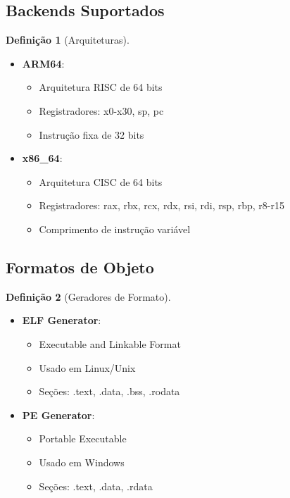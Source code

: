 \documentclass[12pt,a4paper]{article}
\theoremstyle{definition}
\newtheorem{definition}{Definição}[section]
\begin{document}
\subsection{Backends Suportados}

\begin{definition}[Arquiteturas]
\begin{itemize}
    \item \textbf{ARM64}:
    \begin{itemize}
        \item Arquitetura RISC de 64 bits
        \item Registradores: x0-x30, sp, pc
        \item Instrução fixa de 32 bits
    \end{itemize}
    
    \item \textbf{x86\_64}:
    \begin{itemize}
        \item Arquitetura CISC de 64 bits
        \item Registradores: rax, rbx, rcx, rdx, rsi, rdi, rsp, rbp, r8-r15
        \item Comprimento de instrução variável
    \end{itemize}
\end{itemize}
\end{definition}

\subsection{Formatos de Objeto}

\begin{definition}[Geradores de Formato]
\begin{itemize}
    \item \textbf{ELF Generator}:
    \begin{itemize}
        \item Executable and Linkable Format
        \item Usado em Linux/Unix
        \item Seções: .text, .data, .bss, .rodata
    \end{itemize}
    
    \item \textbf{PE Generator}:
    \begin{itemize}
        \item Portable Executable
        \item Usado em Windows
        \item Seções: .text, .data, .rdata
    \end{itemize}
\end{itemize}
\end{definition}
\end{document}
